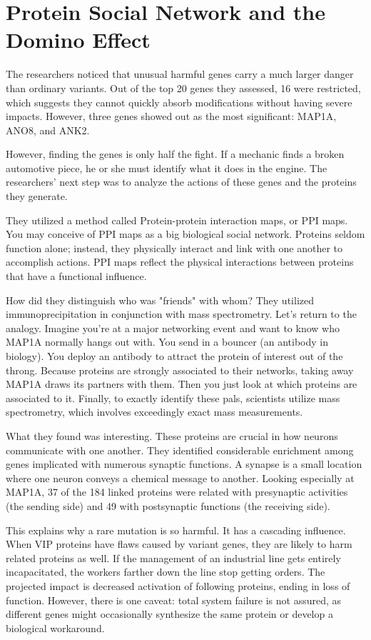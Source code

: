 \section{Protein Social Network and the Domino Effect}  

The researchers noticed that unusual harmful genes carry a much larger danger than ordinary variants.  Out of the top 20 genes they assessed, 16 were restricted, which suggests they cannot quickly absorb modifications without having severe impacts.  However, three genes showed out as the most significant: MAP1A, ANO8, and ANK2.  

However, finding the genes is only half the fight.  If a mechanic finds a broken automotive piece, he or she must identify what it does in the engine.  The researchers' next step was to analyze the actions of these genes and the proteins they generate.  

They utilized a method called Protein-protein interaction maps, or PPI maps.  You may conceive of PPI maps as a big biological social network.  Proteins seldom function alone; instead, they physically interact and link with one another to accomplish actions.  PPI maps reflect the physical interactions between proteins that have a functional influence.  

How did they distinguish who was "friends" with whom?  They utilized immunoprecipitation in conjunction with mass spectrometry.  Let's return to the analogy.  Imagine you're at a major networking event and want to know who MAP1A normally hangs out with. 
You send in a bouncer (an antibody in biology).  You deploy an antibody to attract the protein of interest out of the throng.  Because proteins are strongly associated to their networks, taking away MAP1A draws its partners with them.  Then you just look at which proteins are associated to it. 
Finally, to exactly identify these pals, scientists utilize mass spectrometry, which involves exceedingly exact mass measurements.  

What they found was interesting.  These proteins are crucial in how neurons communicate with one another.  They identified considerable enrichment among genes implicated with numerous synaptic functions.  A synapse is a small location where one neuron conveys a chemical message to another. 
Looking especially at MAP1A, 37 of the 184 linked proteins were related with presynaptic activities (the sending side) and 49 with postsynaptic functions (the receiving side).  

This explains why a rare mutation is so harmful.  It has a cascading influence.  When VIP proteins have flaws caused by variant genes, they are likely to harm related proteins as well.  If the management of an industrial line gets entirely incapacitated, the workers farther down the line stop getting orders. 
The projected impact is decreased activation of following proteins, ending in loss of function.  However, there is one caveat: total system failure is not assured, as different genes might occasionally synthesize the same protein or develop a biological workaround.  

